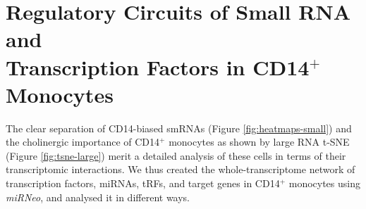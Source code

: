 \begin{figure}
{\label{fig:tsne-small}}
\end{figure}

\newpage

\section{Regulatory Circuits of Small RNA and \\Transcription Factors in CD14$^+$ Monocytes}
The clear separation of CD14-biased smRNAs (Figure \ref{fig:heatmaps-small}) and the cholinergic importance of CD14$^+$ monocytes as shown by large RNA t-SNE (Figure \ref{fig:tsne-large}) merit a detailed analysis of these cells in terms of their transcriptomic interactions. We thus created the whole-transcriptome network of transcription factors, miRNAs, tRFs, and target genes in CD14$^+$ monocytes using \emph{miRNeo}, and analysed it in different ways.

